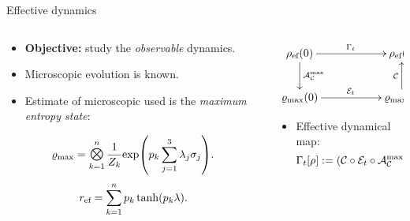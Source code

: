 \begin{frame}{Effective dynamics}
    \begin{columns}
        \begin{column}{0.5\textwidth}
            \begin{itemize}
                \item \textbf{Objective:} study the \textit{observable} dynamics.
                \item Microscopic evolution is known.
                \item Estimate of microscopic used is the \textit{maximum entropy state}:
            \end{itemize}
            \begin{equation}\label{eq:MaxEntSeparable}
                \varrho_{\max}=\Motimes_{k=1}^{n}\frac{1}{Z_{k}}\text{exp}\qty(p_{k}\sum_{j=1}^{3}\lambda_{j}\sigma_{j}).\nonumber
            \end{equation}
            \begin{equation}
                r_{\text{ef}}=\sum_{k=1}^{n}p_{k}\tanh(p_{k}\lambda).\nonumber
            \end{equation}
        \end{column}
        \begin{column}{0.5\textwidth}
            \begin{displaymath}
                \xymatrix{
                  {\rho_{\ef}(0)} \ar[rr]^{\Gamma_{t}} \ar[d]^{\mcA_{\mcC}^{\max}}
                  && {\rho_{\ef}(t)}\\
                  {\varrho_{\max}(0)} \ar[rr]^{\mcE_{t}}
                  && {\varrho_{\max}(t)} \ar[u]^{\mcC}
                }
              \end{displaymath}
              \begin{itemize}
              \item Effective dynamical map:
                \begin{equation*}
                    \Gamma_t[\rho]:=(\mathcal{C} \circ \mathcal{E}_t \circ \mathcal{A}_{\mathcal{C}}^{\max})[\rho_{\text{ef}}].
                \end{equation*}
            \end{itemize}
        \end{column}
    \end{columns}
\end{frame}
